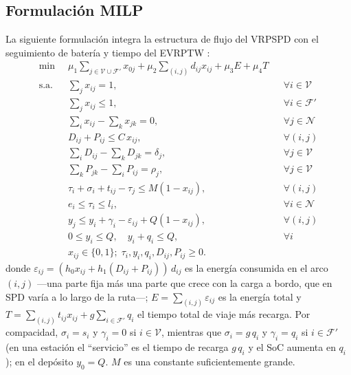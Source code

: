 \documentclass[conference]{IEEEtran}
\begin{document}
\subsection{Formulaci\'on MILP}
La siguiente formulaci\'on integra la estructura de flujo del VRPSPD
\cite{dethloff2001} con el seguimiento de bater\'ia y tiempo del EVRPTW
\cite{schneider2014evrptw}:
\begin{align}
\min\;\; & \mu_1\!\!\sum_{j\in\mathcal{V}\cup\mathcal{F}'}\!\! x_{0j}
         + \mu_2\!\!\sum_{(i,j)}\! d_{ij} x_{ij}
         + \mu_3 E + \mu_4 T \label{eq:obj}\\
\text{s.a.}\;\;
& \textstyle\sum_{j} x_{ij}=1, && \forall i\in\mathcal{V} \label{eq:deg1}\\
& \textstyle\sum_{j} x_{ij}\le1, && \forall i\in\mathcal{F}' \label{eq:deg2}\\
& \textstyle\sum_{i} x_{ij}-\sum_{k} x_{jk}=0, && \forall j\in\mathcal{N} \label{eq:cons}\\
& D_{ij}+P_{ij}\le C\,x_{ij}, && \forall (i,j) \label{eq:cap}\\
& \textstyle\sum_{i} D_{ij}-\sum_{k} D_{jk}=\delta_j, && \forall j\in\mathcal{V} \label{eq:fd}\\
& \textstyle\sum_{k} P_{jk}-\sum_{i} P_{ij}=\rho_j, && \forall j\in\mathcal{V} \label{eq:fp}\\
& \tau_i+\sigma_i+t_{ij}-\tau_j\le M(1-x_{ij}), && \forall (i,j) \label{eq:time}\\
& e_i\le\tau_i\le l_i, && \forall i\in\mathcal{N} \label{eq:tw}\\
& y_j\le y_i+\gamma_i-\varepsilon_{ij}+Q(1-x_{ij}), && \forall (i,j) \label{eq:soc}\\
& 0\le y_i\le Q,\quad y_i+q_i\le Q, && \forall i \label{eq:socb}\\
& x_{ij}\in\{0,1\};\; \tau_i,y_i,q_i,D_{ij},P_{ij}\ge0. && \label{eq:dom}
\end{align}
donde $\varepsilon_{ij}=(h_0 x_{ij}+h_1(D_{ij}+P_{ij}))\,d_{ij}$ es la energ\'ia consumida
en el arco $(i,j)$ ---una parte fija m\'as una parte que crece con la carga a
bordo, que en SPD var\'ia a lo largo de la ruta---; $E=\sum_{(i,j)}\varepsilon_{ij}$ es la
energ\'ia total y $T=\sum_{(i,j)}t_{ij}x_{ij}+g\sum_{i\in\mathcal{F}'}q_i$ el
tiempo total de viaje m\'as recarga. Por compacidad, $\sigma_i=s_i$ y
$\gamma_i=0$ si $i\in\mathcal{V}$, mientras que $\sigma_i=g\,q_i$ y
$\gamma_i=q_i$ si $i\in\mathcal{F}'$ (en una estaci\'on el ``servicio'' es el
tiempo de recarga $g\,q_i$ y el SoC aumenta en $q_i$); en el dep\'osito
$y_0=Q$. $M$ es una constante suficientemente grande.
\end{document}
